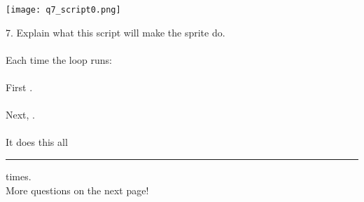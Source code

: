 \begin{center}
\texttt{[image: q7\_script0.png]}
\end{center}
7. Explain what this script will make the sprite do. \\ \\
Each time the loop runs: \\ \\
\indent First \hrulefill. \\ \\
\indent Next, \hrulefill. \\ \\
It does this all \rule{1cm}{0.5pt} times. \\

\noindent More questions on the next page! \dotfill \\
\newpage
